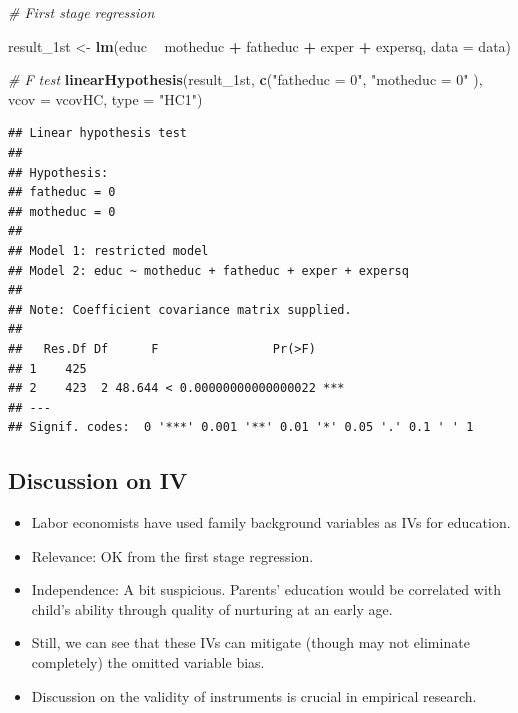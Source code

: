 \documentclass[]{book}
\newenvironment{Shaded}{\begin{snugshade}}{\end{snugshade}}
\newcommand{\KeywordTok}[1]{\textcolor[rgb]{0.13,0.29,0.53}{\textbf{#1}}}
\newcommand{\DataTypeTok}[1]{\textcolor[rgb]{0.13,0.29,0.53}{#1}}
\newcommand{\StringTok}[1]{\textcolor[rgb]{0.31,0.60,0.02}{#1}}
\newcommand{\CommentTok}[1]{\textcolor[rgb]{0.56,0.35,0.01}{\textit{#1}}}
\newcommand{\OperatorTok}[1]{\textcolor[rgb]{0.81,0.36,0.00}{\textbf{#1}}}
\newcommand{\NormalTok}[1]{#1}
\providecommand{\tightlist}{%
  \setlength{\itemsep}{0pt}\setlength{\parskip}{0pt}}
\begin{document}
\begin{Shaded}
\begin{Highlighting}[]
\CommentTok{# First stage regression }

\NormalTok{result_1st <-}\StringTok{ }\KeywordTok{lm}\NormalTok{(educ }\OperatorTok{~}\StringTok{ }\NormalTok{motheduc }\OperatorTok{+}\StringTok{ }\NormalTok{fatheduc }\OperatorTok{+}\StringTok{ }\NormalTok{exper }\OperatorTok{+}\StringTok{ }\NormalTok{expersq, }\DataTypeTok{data =}\NormalTok{ data)}

\CommentTok{# F test}
\KeywordTok{linearHypothesis}\NormalTok{(result_1st, }
                 \KeywordTok{c}\NormalTok{(}\StringTok{"fatheduc = 0"}\NormalTok{, }\StringTok{"motheduc = 0"}\NormalTok{ ), }
                 \DataTypeTok{vcov =}\NormalTok{ vcovHC, }\DataTypeTok{type =} \StringTok{"HC1"}\NormalTok{)}
\end{Highlighting}
\end{Shaded}

\begin{verbatim}
## Linear hypothesis test
## 
## Hypothesis:
## fatheduc = 0
## motheduc = 0
## 
## Model 1: restricted model
## Model 2: educ ~ motheduc + fatheduc + exper + expersq
## 
## Note: Coefficient covariance matrix supplied.
## 
##   Res.Df Df      F                Pr(>F)    
## 1    425                                    
## 2    423  2 48.644 < 0.00000000000000022 ***
## ---
## Signif. codes:  0 '***' 0.001 '**' 0.01 '*' 0.05 '.' 0.1 ' ' 1
\end{verbatim}

\subsection{Discussion on IV}\label{discussion-on-iv}

\begin{itemize}
\tightlist
\item
  Labor economists have used family background variables as IVs for
  education.
\item
  Relevance: OK from the first stage regression.
\item
  Independence: A bit suspicious. Parents' education would be correlated
  with child's ability through quality of nurturing at an early age.
\item
  Still, we can see that these IVs can mitigate (though may not
  eliminate completely) the omitted variable bias.
\item
  Discussion on the validity of instruments is crucial in empirical
  research.
\end{itemize}
\end{document}

